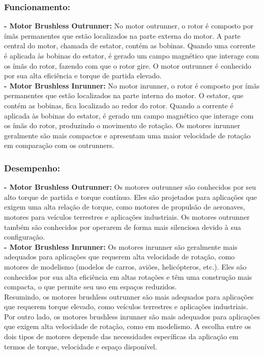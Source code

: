 \documentclass[a4paper, 12pt]{article}
\begin{document}
\subsubsection{Funcionamento:}
\textbf{- Motor Brushless Outrunner:} No motor outrunner, o rotor é composto por ímãs permanentes que estão localizados na parte externa do motor. A parte central do motor, chamada de estator, contém as bobinas. Quando uma corrente é aplicada às bobinas do estator, é gerado um campo magnético que interage com os ímãs do rotor, fazendo com que o rotor gire. O motor outrunner é conhecido por sua alta eficiência e torque de partida elevado.\\

\textbf{- Motor Brushless Inrunner:} No motor inrunner, o rotor é composto por ímãs permanentes que estão localizados na parte interna do motor. O estator, que contém as bobinas, fica localizado ao redor do rotor. Quando a corrente é aplicada às bobinas do estator, é gerado um campo magnético que interage com os ímãs do rotor, produzindo o movimento de rotação. Os motores inrunner geralmente são mais compactos e apresentam uma maior velocidade de rotação em comparação com os outrunners.\\

\subsubsection{Desempenho:}
\textbf{- Motor Brushless Outrunner:} Os motores outrunner são conhecidos por seu alto torque de partida e torque contínuo. Eles são projetados para aplicações que exigem uma alta relação de torque, como motores de propulsão de aeronaves, motores para veículos terrestres e aplicações industriais. Os motores outrunner também são conhecidos por operarem de forma mais silenciosa devido à sua configuração.\\

\textbf{- Motor Brushless Inrunner:} Os motores inrunner são geralmente mais adequados para aplicações que requerem alta velocidade de rotação, como motores de modelismo (modelos de carros, aviões, helicópteros, etc.). Eles são conhecidos por sua alta eficiência em altas rotações e têm uma construção mais compacta, o que permite seu uso em espaços reduzidos.\\

Resumindo, os motores brushless outrunner são mais adequados para aplicações que requerem torque elevado, como veículos terrestres e aplicações industriais. Por outro lado, os motores brushless inrunner são mais adequados para aplicações que exigem alta velocidade de rotação, como em modelismo. A escolha entre os dois tipos de motores depende das necessidades específicas da aplicação em termos de torque, velocidade e espaço disponível.











\newpage
    \nocite{*}
    
    
\end{document}
